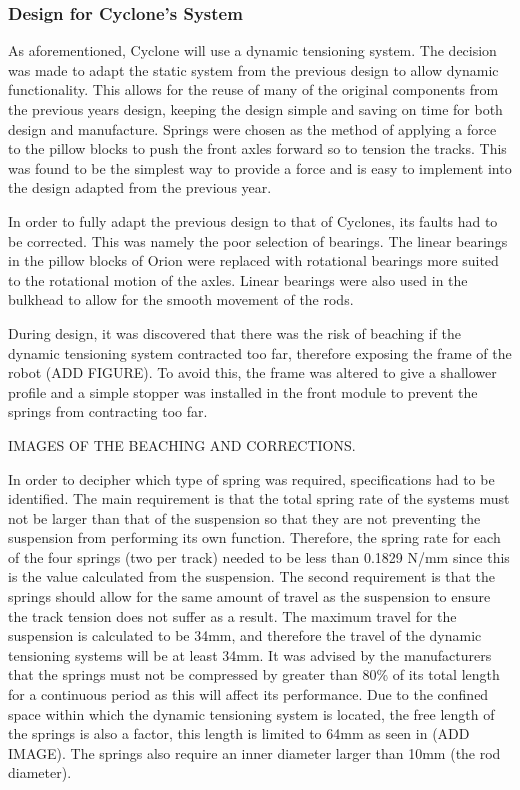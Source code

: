 \subsubsection{Design for Cyclone's System}
As aforementioned, Cyclone will use a dynamic tensioning system. The decision was made to adapt the static system from the previous design to allow dynamic functionality. This allows for the reuse of many of the original components from the previous years design, keeping the design simple and saving on time for both design and manufacture. Springs were chosen as the method of applying a force to the pillow blocks to push the front axles forward so to tension the tracks.  This was found to be the simplest way to provide a force and is easy to implement into the design adapted from the previous year. \par
In order to fully adapt the previous design to that of Cyclones, its faults had to be corrected. This was namely the poor selection of bearings. The linear bearings in the pillow blocks of Orion were replaced with rotational bearings more suited to the rotational motion of the axles. Linear bearings were also used in the bulkhead to allow for the smooth movement of the rods. \par
During design, it was discovered that there was the risk of beaching if the dynamic tensioning system contracted too far, therefore exposing the frame of the robot (ADD FIGURE). To avoid this, the frame was altered to give a shallower profile and a simple stopper was installed in the front module to prevent the springs from contracting too far. \par
IMAGES OF THE BEACHING AND CORRECTIONS. \par
In order to decipher which type of spring was required, specifications had to be identified. The main requirement is that the total spring rate of the systems must not be larger than that of the suspension so that they are not preventing the suspension from performing its own function. Therefore, the spring rate for each of the four springs (two per track) needed to be less than 0.1829 N/mm since this is the value calculated from the suspension. The second requirement is that the springs should allow for the same amount of travel as the suspension to ensure the track tension does not suffer as a result. The maximum travel for the suspension is calculated to be 34mm, and therefore the travel of the dynamic tensioning systems will be at least 34mm. It was advised by the manufacturers that the springs must not be compressed by greater than 80\% of its total length for a continuous period as this will affect its performance. Due to the confined space within which the dynamic tensioning system is located, the free length of the springs is also a factor, this length is limited to 64mm as seen in (ADD IMAGE). The springs also require an inner diameter larger than 10mm (the rod diameter). \par
